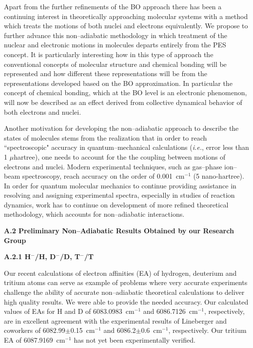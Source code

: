 Apart from the further refinements of 
the BO approach
there has been a continuing
interest in theoretically approaching molecular systems 
with a method which treats
the motions of both nuclei and electrons equivalently.
We propose to further advance this non--adiabatic methodology 
in which treatment of the nuclear and electronic motions
in molecules departs entirely from the PES concept. 
It is particularly
interesting how in this type of approach the conventional concepts
of molecular structure and chemical bonding will be represented
and how different these representations will be 
from the representations
developed based on the BO approximation. In particular the concept
of chemical bonding, which at the BO level is an electronic 
phenomenon, will now be described as an effect derived from
collective dynamical behavior of both electrons and nuclei.

Another motivation for developing the non--adiabatic approach to 
describe the states of molecules stems from the realization that
in order to reach ``spectroscopic" accuracy in quantum--mechanical
calculations ({\it i.e.}, error less than 1 $\mu$hartree), one needs
to account for the the coupling between
motions of electrons and nuclei. Modern experimental techniques,
such as gas--phase ion--beam spectroscopy, reach accuracy on the
order of 0.001~cm$^{-1}$ (5 nano-hartree).\cite{C} 
In order for quantum molecular mechanics
to continue providing assistance in resolving and assigning
experimental spectra, especially in studies of reaction dynamics,
work has to continue on development of more refined theoretical 
methodology, which accounts for non--adiabatic interactions.

\vspace{3mm}
\noindent
{\bf A.2 Preliminary Non--Adiabatic Results 
Obtained by our Research Group}
\vspace{2mm}

\vspace{2mm}
{\bf A.2.1 H$^-$/H, D$^-$/D, T$^-$/T}

Our recent calculations of electron affinities (EA) of hydrogen, deuterium
and tritium atoms \cite{A37} can serve as example of 
problems where very accurate experiments challenge the ability
of accurate non--adiabatic theoretical calculations 
to deliver high quality results. 
We were able to provide the needed accuracy.
Our calculated values of EAs for H and D of 6083.0983~cm$^{-1}$
and 6086.7126~cm$^{-1}$, respectively, are in excellent
agreement with the experimental results of Lineberger and
coworkers of 6082.99$\pm$0.15~cm$^{-1}$ and 6086.2$\pm$0.6~cm$^{-1}$,
respectively. Our tritium EA of 6087.9169~cm$^{-1}$ has not yet 
been experimentally verified. 



